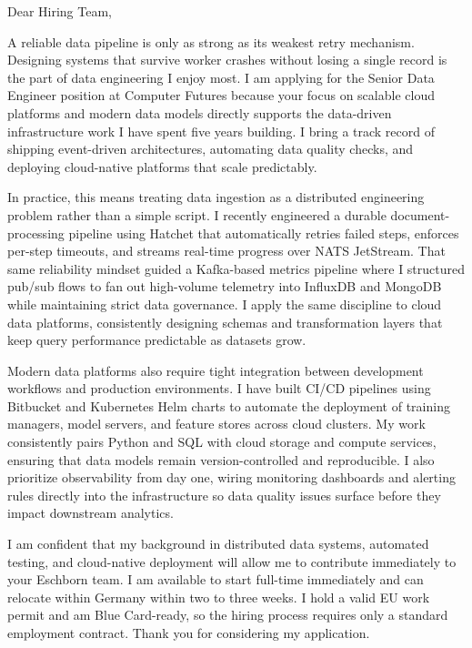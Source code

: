 \documentclass[11pt,a4paper]{coverletter}
\begin{document}

\opening{Dear Hiring Team,}

A reliable data pipeline is only as strong as its weakest retry mechanism. Designing systems that survive worker crashes without losing a single record is the part of data engineering I enjoy most. I am applying for the Senior Data Engineer position at Computer Futures because your focus on scalable cloud platforms and modern data models directly supports the data-driven infrastructure work I have spent five years building. I bring a track record of shipping event-driven architectures, automating data quality checks, and deploying cloud-native platforms that scale predictably.

In practice, this means treating data ingestion as a distributed engineering problem rather than a simple script. I recently engineered a durable document-processing pipeline using Hatchet that automatically retries failed steps, enforces per-step timeouts, and streams real-time progress over NATS JetStream. That same reliability mindset guided a Kafka-based metrics pipeline where I structured pub/sub flows to fan out high-volume telemetry into InfluxDB and MongoDB while maintaining strict data governance. I apply the same discipline to cloud data platforms, consistently designing schemas and transformation layers that keep query performance predictable as datasets grow.

Modern data platforms also require tight integration between development workflows and production environments. I have built CI/CD pipelines using Bitbucket and Kubernetes Helm charts to automate the deployment of training managers, model servers, and feature stores across cloud clusters. My work consistently pairs Python and SQL with cloud storage and compute services, ensuring that data models remain version-controlled and reproducible. I also prioritize observability from day one, wiring monitoring dashboards and alerting rules directly into the infrastructure so data quality issues surface before they impact downstream analytics.

I am confident that my background in distributed data systems, automated testing, and cloud-native deployment will allow me to contribute immediately to your Eschborn team. I am available to start full-time immediately and can relocate within Germany within two to three weeks. I hold a valid EU work permit and am Blue Card-ready, so the hiring process requires only a standard employment contract. Thank you for considering my application.
\end{document}
